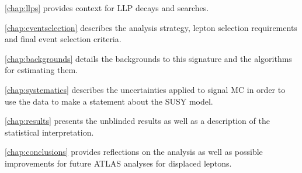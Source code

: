 \autoref{chap:llps} provides context for \ac{LLP} decays and searches.

\autoref{chap:eventselection} describes the analysis strategy, lepton selection requirements and final event selection criteria.

\autoref{chap:backgrounds} details the backgrounds to this signature and the algorithms for estimating them.

\autoref{chap:systematics} describes the uncertainties applied to signal \ac{MC} in order to use the data to make a statement about the \ac{SUSY} model.

\autoref{chap:results} presents the unblinded results as well as a description of the statistical interpretation. 

\autoref{chap:conclusions} provides reflections on the analysis as well as possible improvements for future \ac{ATLAS} analyses for displaced leptons.


